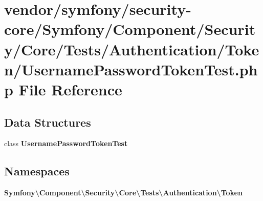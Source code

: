 \section{vendor/symfony/security-\/core/\+Symfony/\+Component/\+Security/\+Core/\+Tests/\+Authentication/\+Token/\+Username\+Password\+Token\+Test.php File Reference}
\label{_username_password_token_test_8php}
\subsection*{Data Structures}
\begin{DoxyCompactItemize}
\item 
class {\bf Username\+Password\+Token\+Test}
\end{DoxyCompactItemize}
\subsection*{Namespaces}
\begin{DoxyCompactItemize}
\item 
 {\bf Symfony\textbackslash{}\+Component\textbackslash{}\+Security\textbackslash{}\+Core\textbackslash{}\+Tests\textbackslash{}\+Authentication\textbackslash{}\+Token}
\end{DoxyCompactItemize}
